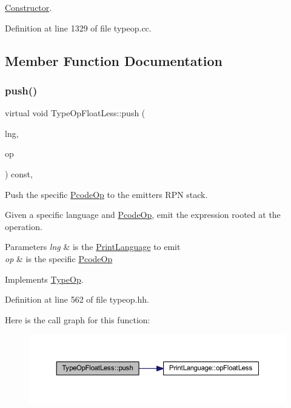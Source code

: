 \mbox{\hyperlink{class_constructor}{Constructor}}. 



Definition at line 1329 of file typeop.\+cc.



\subsection{Member Function Documentation}
\mbox{\label{class_type_op_float_less_a6d524f64314447c004973dc563adf2dc}} 
\subsubsection{\texorpdfstring{push()}{push()}}
{\footnotesize\ttfamily virtual void Type\+Op\+Float\+Less\+::push (\begin{DoxyParamCaption}\item[{\mbox{\hyperlink{class_print_language}{Print\+Language}} $\ast$}]{lng,  }\item[{const \mbox{\hyperlink{class_pcode_op}{Pcode\+Op}} $\ast$}]{op }\end{DoxyParamCaption}) const\hspace{0.3cm}{\ttfamily [inline]}, {\ttfamily [virtual]}}



Push the specific \mbox{\hyperlink{class_pcode_op}{Pcode\+Op}} to the emitter\textquotesingle{}s R\+PN stack. 

Given a specific language and \mbox{\hyperlink{class_pcode_op}{Pcode\+Op}}, emit the expression rooted at the operation. 
\begin{DoxyParams}{Parameters}
{\em lng} & is the \mbox{\hyperlink{class_print_language}{Print\+Language}} to emit \\
\hline
{\em op} & is the specific \mbox{\hyperlink{class_pcode_op}{Pcode\+Op}} \\
\hline
\end{DoxyParams}


Implements \mbox{\hyperlink{class_type_op_ac9c9544203ed74dabe6ac662b653b2af}{Type\+Op}}.



Definition at line 562 of file typeop.\+hh.

Here is the call graph for this function\+:
\nopagebreak
\begin{figure}[H]
\begin{center}
\leavevmode
\includegraphics[width=350pt]{class_type_op_float_less_a6d524f64314447c004973dc563adf2dc_cgraph}
\end{center}
\end{figure}


